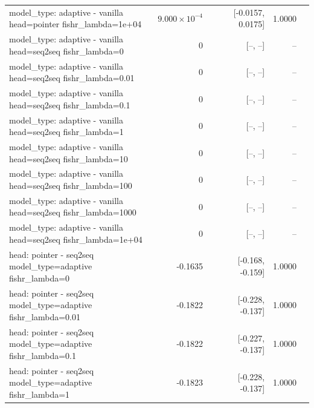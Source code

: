 \documentclass[10pt]{article}
\makeatletter
\newcommand{\stackcell}[1]{\begin{tabular}[t]{@{}l@{}}#1\end{tabular}}
\makeatother
\begin{document}
{\begin{longtable}{lrrrl}
\stackcell{model\_type: adaptive - vanilla\\\footnotesize head=pointer fishr\_lambda=1e+04 } & $9.000\times10^{-4}$ & [-0.0157, 0.0175] & 1.0000 & \\
\stackcell{model\_type: adaptive - vanilla\\\footnotesize head=seq2seq fishr\_lambda=0 } & 0 & [--, --] & -- & \\
\stackcell{model\_type: adaptive - vanilla\\\footnotesize head=seq2seq fishr\_lambda=0.01 } & 0 & [--, --] & -- & \\
\stackcell{model\_type: adaptive - vanilla\\\footnotesize head=seq2seq fishr\_lambda=0.1 } & 0 & [--, --] & -- & \\
\stackcell{model\_type: adaptive - vanilla\\\footnotesize head=seq2seq fishr\_lambda=1 } & 0 & [--, --] & -- & \\
\stackcell{model\_type: adaptive - vanilla\\\footnotesize head=seq2seq fishr\_lambda=10 } & 0 & [--, --] & -- & \\
\stackcell{model\_type: adaptive - vanilla\\\footnotesize head=seq2seq fishr\_lambda=100 } & 0 & [--, --] & -- & \\
\stackcell{model\_type: adaptive - vanilla\\\footnotesize head=seq2seq fishr\_lambda=1000 } & 0 & [--, --] & -- & \\
\stackcell{model\_type: adaptive - vanilla\\\footnotesize head=seq2seq fishr\_lambda=1e+04 } & 0 & [--, --] & -- & \\
\stackcell{head: pointer - seq2seq\\\footnotesize model\_type=adaptive fishr\_lambda=0 } & -0.1635 & [-0.168, -0.159] & 1.0000 & \\
\stackcell{head: pointer - seq2seq\\\footnotesize model\_type=adaptive fishr\_lambda=0.01 } & -0.1822 & [-0.228, -0.137] & 1.0000 & \\
\stackcell{head: pointer - seq2seq\\\footnotesize model\_type=adaptive fishr\_lambda=0.1 } & -0.1822 & [-0.227, -0.137] & 1.0000 & \\
\stackcell{head: pointer - seq2seq\\\footnotesize model\_type=adaptive fishr\_lambda=1 } & -0.1823 & [-0.228, -0.137] & 1.0000 & \\

\end{longtable}}
\end{document}
